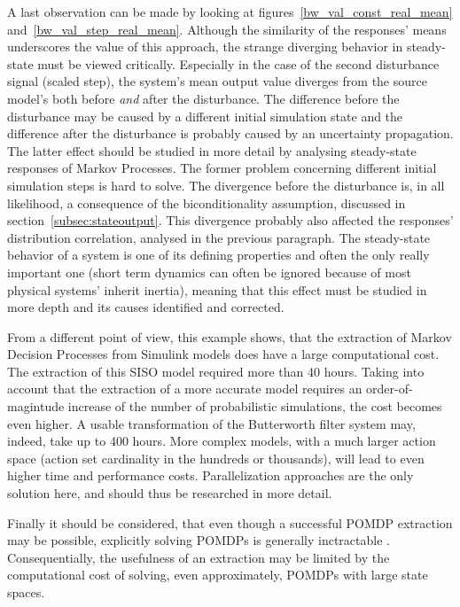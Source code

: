 A last observation can be made by looking at figures~\ref{bw_val_const_real_mean} and~\ref{bw_val_step_real_mean}. Although the similarity of the responses' means underscores the value of this approach, the strange diverging behavior in steady-state must be viewed critically. Especially in the case of the second disturbance signal (scaled step), the system's mean output value diverges from the source model's both before \textit{and} after the disturbance. The difference before the disturbance may be caused by a different initial simulation state and the difference after the disturbance is probably caused by an uncertainty propagation. The latter effect should be studied in more detail by analysing steady-state responses of Markov Processes. The former problem concerning different initial simulation steps is hard to solve. The divergence before the disturbance is, in all likelihood, a consequence of the biconditionality assumption, discussed in section~\ref{subsec:stateoutput}. This divergence probably also affected the responses' distribution correlation, analysed in the previous paragraph. The steady-state behavior of a system is one of its defining properties and often the only really important one (short term dynamics can often be ignored because of most physical systems' inherit inertia), meaning that this effect must be studied in more depth and its causes identified and corrected.

From a different point of view, this example shows, that the extraction of Markov Decision Processes from Simulink models does have a large computational cost. The extraction of this SISO model required more than 40 hours. Taking into account that the extraction of a more accurate model requires an order-of-magintude increase of the number of probabilistic simulations, the cost becomes even higher. A usable transformation of the Butterworth filter system may, indeed, take up to 400 hours. More complex models, with a much larger action space (action set cardinality in the hundreds or thousands), will lead to even higher time and performance costs. Parallelization approaches are the only solution here, and should thus be researched in more detail.

Finally it should be considered, that even though a successful POMDP extraction may be possible, explicitly solving POMDPs is generally inctractable \cite{littman96}. Consequentially, the usefulness of an extraction may be limited by the computational cost of solving, even approximately, POMDPs with large state spaces.

